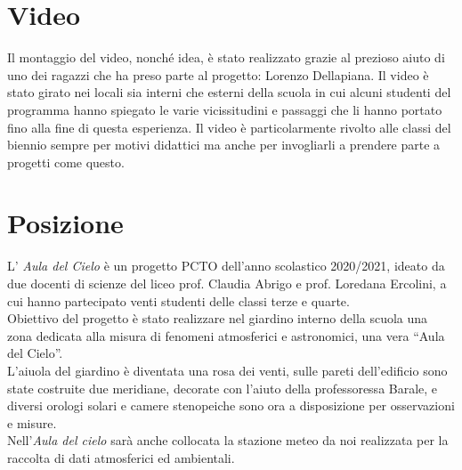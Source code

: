 \documentclass{article}
\begin{document}
\section{Video}

Il montaggio del video, nonché idea,  è stato realizzato grazie al prezioso aiuto di uno dei ragazzi che ha preso parte al progetto: Lorenzo Dellapiana.
Il video è stato girato nei locali sia interni che esterni della scuola in cui alcuni studenti del programma hanno spiegato le varie vicissitudini e passaggi che li hanno portato fino alla fine di questa esperienza. Il video è particolarmente rivolto alle classi del biennio sempre per motivi didattici ma anche per invogliarli a prendere parte a progetti come questo.
\section{Posizione}
L' \emph{Aula del Cielo} è un progetto PCTO dell’anno scolastico 2020/2021, ideato da due docenti di scienze del liceo prof. Claudia Abrigo e prof. Loredana Ercolini, a cui hanno partecipato venti studenti delle classi terze e quarte.\\
Obiettivo del progetto è stato realizzare  nel giardino interno della scuola una zona dedicata alla misura di fenomeni atmosferici e astronomici, una vera “Aula del Cielo”. \\
L’aiuola del giardino è diventata una rosa dei venti, sulle pareti dell’edificio sono state costruite due meridiane, decorate con l’aiuto della professoressa Barale, e diversi orologi solari e camere stenopeiche sono ora a disposizione per osservazioni e misure.\\
Nell’\emph{Aula del cielo} sarà anche collocata la stazione meteo da noi realizzata per la raccolta di dati atmosferici ed ambientali.
\end{document}
